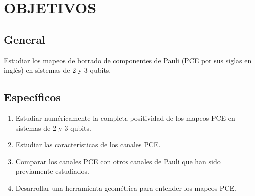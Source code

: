 \chapter{OBJETIVOS}
\section*{General}
Estudiar los mapeos de borrado de componentes de Pauli (PCE por
sus siglas en inglés) en sistemas de 2 y 3 qubits.


\section*{Específicos}

\begin{enumerate}
\item Estudiar numéricamente la completa positividad de los mapeos 
PCE en sistemas de 2 y 3 qubits.

\item Estudiar las características de los canales PCE.

\item Comparar los canales PCE con otros canales de Pauli que han 
sido previamente estudiados.

\item Desarrollar una herramienta geométrica para entender los 
mapeos PCE.
\end{enumerate}


